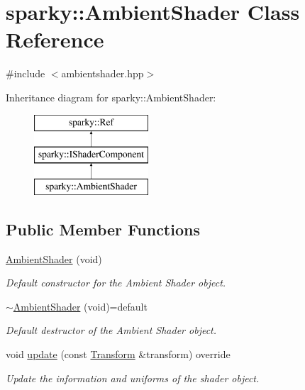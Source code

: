 \hypertarget{classsparky_1_1_ambient_shader}{}\section{sparky\+:\+:Ambient\+Shader Class Reference}
\label{classsparky_1_1_ambient_shader}


{\ttfamily \#include $<$ambientshader.\+hpp$>$}

Inheritance diagram for sparky\+:\+:Ambient\+Shader\+:\begin{figure}[H]
\begin{center}
\leavevmode
\includegraphics[height=3.000000cm]{classsparky_1_1_ambient_shader}
\end{center}
\end{figure}
\subsection*{Public Member Functions}
\begin{DoxyCompactItemize}
\item 
\hyperlink{classsparky_1_1_ambient_shader_a7ffde9f9b7e3cd9d92aaaa0511ac89e8}{Ambient\+Shader} (void)
\begin{DoxyCompactList}\small\item\em Default constructor for the Ambient Shader object. \end{DoxyCompactList}\item 
\hyperlink{classsparky_1_1_ambient_shader_a06c52f4f7c759db3057ed6cb198665ea}{$\sim$\+Ambient\+Shader} (void)=default\hypertarget{classsparky_1_1_ambient_shader_a06c52f4f7c759db3057ed6cb198665ea}{}\label{classsparky_1_1_ambient_shader_a06c52f4f7c759db3057ed6cb198665ea}

\begin{DoxyCompactList}\small\item\em Default destructor of the Ambient Shader object. \end{DoxyCompactList}\item 
void \hyperlink{classsparky_1_1_ambient_shader_a9874223230a47d9f9bd82195e4ed270f}{update} (const \hyperlink{classsparky_1_1_transform}{Transform} \&transform) override
\begin{DoxyCompactList}\small\item\em Update the information and uniforms of the shader object. \end{DoxyCompactList}\end{DoxyCompactItemize}
